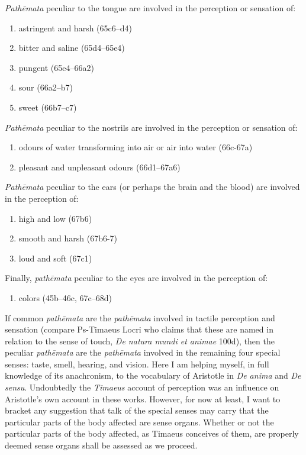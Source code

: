 \emph{Pathēmata} peculiar to the tongue are involved in the perception or sensation of:
\begin{enumerate}
	\item astringent and harsh (65c6--d4)
	\item bitter and saline (65d4--65e4)
	\item pungent (65e4--66a2)
	\item sour (66a2--b7)
	\item sweet (66b7--c7)
\end{enumerate}

\emph{Pathēmata} peculiar to the nostrils are involved in the perception or sensation of:
\begin{enumerate}
	\item odours of water transforming into air or air into water (66c-67a)
	\item pleasant and unpleasant odours (66d1--67a6)
\end{enumerate}

\emph{Pathēmata} peculiar to the ears (or perhaps the brain and the blood) are involved in the perception of:
\begin{enumerate}
	\item high and low (67b6)
	\item smooth and harsh (67b6-7)
	\item loud and soft (67c1)
\end{enumerate}

Finally, \emph{pathēmata} peculiar to the eyes are involved in the perception of:
\begin{enumerate}
	\item colors (45b--46c, 67c--68d)
\end{enumerate}

If common \emph{pathēmata} are the \emph{pathēmata} involved in tactile perception and sensation (compare Ps-Timaeus Locri who claims that these are named in relation to the sense of touch, \emph{De natura mundi et animae} 100d), then the peculiar \emph{pathēmata} are the \emph{pathēmata} involved in the remaining four special senses: taste, smell, hearing, and vision. Here I am helping myself, in full knowledge of its anachronism, to the vocabulary of Aristotle in \emph{De anima} and \emph{De sensu}. Undoubtedly the \emph{Timaeus} account of perception was an influence on Aristotle's own account in these works. However, for now at least, I want to bracket any suggestion that talk of the special senses may carry that the particular parts of the body affected are sense organs. Whether or not the particular parts of the body affected, as Timaeus conceives of them, are properly deemed sense organs shall be assessed as we proceed.

